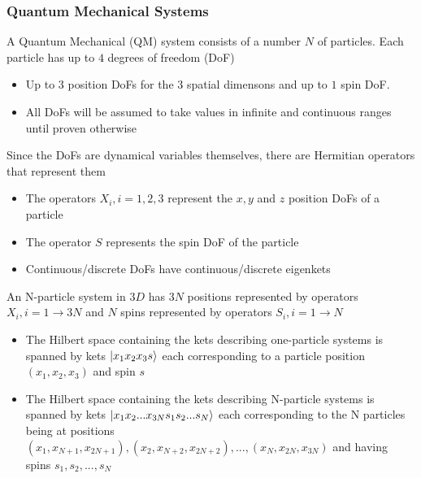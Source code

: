\documentclass[8pt,t,mathserif,aspectratio=169]{beamer}
\begin{document}
\begin{frame}
  \frametitle{Quantum Mechanical Systems}
  \vspace{1mm}
  A Quantum Mechanical (QM) system consists of a number $N$ of particles. Each particle has up to $4$ degrees of freedom (DoF)
  \begin{itemize}
    \item Up to $3$ position DoFs for the $3$ spatial dimensons and up to $1$ spin DoF.
    \item All DoFs will be assumed to take values in infinite and continuous ranges until proven otherwise
  \end{itemize}
  Since the DoFs are dynamical variables themselves, there are Hermitian operators that represent them
  \begin{itemize}
    \item The operators $X_i, i = 1,2,3$ represent the $x,y$ and $z$ position DoFs of a particle
    \item The operator $S$ represents the spin DoF of the particle
    \item Continuous/discrete DoFs have continuous/discrete eigenkets
    \end{itemize}
  An N-particle system in $3D$ has $3N$ positions represented by operators $X_i, i = 1 \to 3N$ and $N$ spins represented by operators $S_i, i = 1 \to N$
  \begin{itemize}
    \item The Hilbert space containing the kets describing one-particle systems is spanned by kets $\ket{x_1 x_2 x_3 s}$ each corresponding to a particle position $(x_1,x_2,x_3)$ and spin $s$
    \item The Hilbert space containing the kets describing N-particle systems is spanned by kets $\ket{x_1 x_2 ... x_{3N} s_1 s_2 ... s_N}$ each corresponding to the N particles being at positions $(x_1,x_{N+1},x_{2N+1}), (x_2,x_{N+2},x_{2N+2}), ..., (x_N,x_{2N},x_{3N})$ and having spins $s_1,s_2,...,s_N$
  \end{itemize}
\end{frame}
\end{document}
